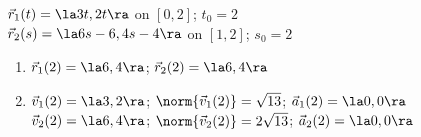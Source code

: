 {$\vec r_1(t) = \la 3t,2t\ra$ on $[0,2]$; $t_0 = 2$\\
$\vec r_2(s) = \la 6s-6,4s-4\ra$ on $[1,2]$; $s_0 = 2$
}
{
\begin{enumerate}
	\item $\vec r_1(2) = \la6,4\ra$; $\vec r_2(2) = \la 6,4\ra$
	\item	$\vec v_1(2) = \la 3,2\ra$; $\norm{\vec v_1(2)} = \sqrt{13}$; $\vec a_1(2) = \la 0,0\ra$\\
			$\vec v_2(2) = \la 6,4\ra$; $\norm{\vec v_2(2)} = 2\sqrt{13}$; $\vec a_2(2) = \la 0,0\ra$
\end{enumerate}
}